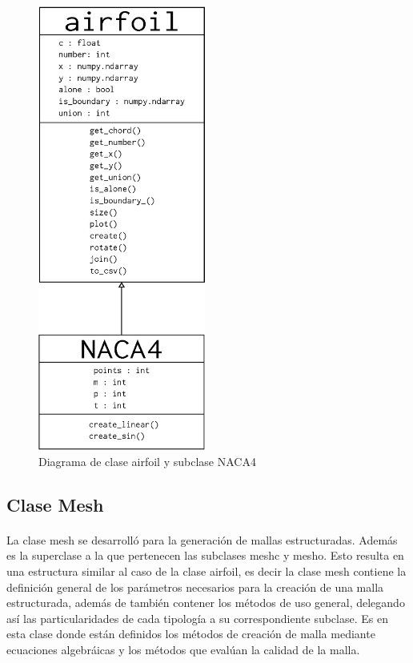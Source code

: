 \documentclass[letterpaper, openright, 12pt]{book}
\begin{document}
    \begin{figure}[H]
        \centering
        \includegraphics[keepaspectratio, width=55mm]{./img/airfoil_class}
        \caption[Diagrama de clase airfoil y subclase NACA4]{Diagrama de clase
        airfoil y subclase NACA4}
        \label{airfoil_class}
    \end{figure}


    \subsection{Clase Mesh}
    \paragraph*{}
        La clase mesh se desarrolló para la generación de mallas estructuradas.
        Además es la superclase a la que pertenecen las subclases
        mesh\textunderscore c y mesh\textunderscore o. Esto resulta en una
        estructura similar al caso de la clase airfoil, es decir la clase mesh
        contiene la definición general de los parámetros necesarios para la
        creación de una malla estructurada, además de también contener los
        métodos de uso general, delegando así las particularidades de cada
        tipología a su correspondiente subclase. Es en esta clase donde están
        definidos los métodos de creación de malla mediante ecuaciones
        algebráicas y los métodos que evalúan la calidad de la malla.
\end{document}
